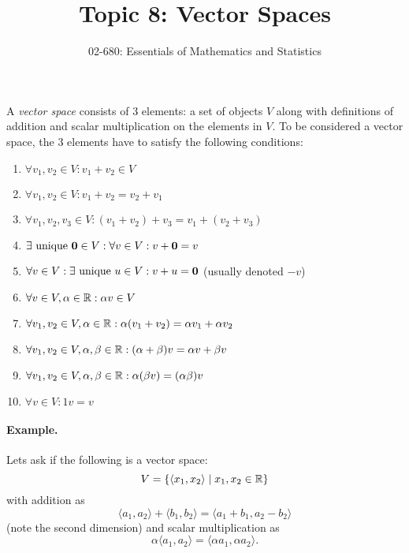 


\title{Topic 8: Vector Spaces}
\author{02-680: Essentials of Mathematics and Statistics}


\maketitle

A \emph{vector space} consists of 3 elements: 
a set of objects $V$ along with definitions of addition and scalar multiplication on the elements in $V$. 
To be considered a vector space, the 3 elements have to satisfy the following conditions: 
\begin{enumerate}
\item $\forall v_1,v_2 \in V : v_1+v_2 \in V$
\item $\forall v_1,v_2 \in V : v_1 + v_2 = v_2 + v_1$
\item $\forall v_1,v_2,v_3 \in V : (v_1 + v_2) + v_3 = v_1 + (v_2 + v_3)$
\item $\exists \textnormal{ unique }\mathbf{0} \in V : \forall v \in V : v + \mathbf{0} = v$ 
\item $\forall v \in V : \exists \textnormal{ unique }u \in V : v + u = \mathbf{0}$ (usually denoted $-v$)
\item $\forall v\in V, \alpha \in \operatorname{\mathbb{R}}: \alpha v \in V$
\item $\forall v_1,v_2\in V, \alpha \in \operatorname{\mathbb{R}}: \alpha (v_1 + v_2) = \alpha v_1 + \alpha v_2$
\item $\forall v_1,v_2\in V, \alpha,\beta \in \operatorname{\mathbb{R}}: (\alpha+\beta) v = \alpha v + \beta v$
\item $\forall v_1,v_2\in V, \alpha,\beta \in \operatorname{\mathbb{R}}: \alpha(\beta v) = (\alpha\beta) v$
\item$\forall v \in V : 1v = v$ 
\end{enumerate} 

\paragraph{Example.} 
Lets ask if the following is a vector space: 
\[V = \left\{\left\langle x_1, x_2\right\rangle \mid x_1,x_2 \in \operatorname{\mathbb{R}} \right\}\]
with addition as 
\[ \langle a_1,a_2\rangle + \langle b_1, b_2\rangle = \langle a_1+b_1, a_2-b_2\rangle\]
(note the second dimension)
and scalar multiplication as 
\[\alpha \langle a_1,a_2\rangle = \langle \alpha a_1, \alpha a_2\rangle.\]

